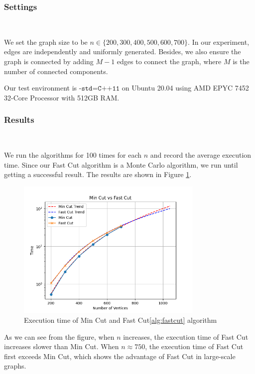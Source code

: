 \documentclass[12pt]{article}
\begin{document}
\subsubsection{Settings}\

We set the graph size to be $n\in\{200,300,400,500,600,700\}$. In our experiment, edges are independently and uniformly generated. Besides, we also ensure the graph is connected by adding $M-1$ edges to connect the graph, where $M$ is the number of connected components.

Our test environment is $\texttt{-std=C++11}$ on Ubuntu 20.04 using AMD EPYC 7452 32-Core Processor with 512GB RAM.

\subsubsection{Results}\

We run the algorithms for 100 times for each $n$ and record the average execution time. Since our Fast Cut algorithm is a Monte Carlo algorithm, we run until getting a successful result.  The results are shown in Figure \ref{fig:mc}.

\begin{figure}[h]
    \centering
    \includegraphics[width=0.8\textwidth]{../MinCut/MinCut.png}
    \caption{Execution time of Min Cut and Fast Cut\ref{alg:fastcut} algorithm}
    \label{fig:mc}
\end{figure}

As we can see from the figure, when $n$ increases, the execution time of Fast Cut increases slower than Min Cut. When $n\approx 750$, the execution time of Fast Cut first exceeds Min Cut, which shows the advantage of Fast Cut in large-scale graphs.

\end{document}
